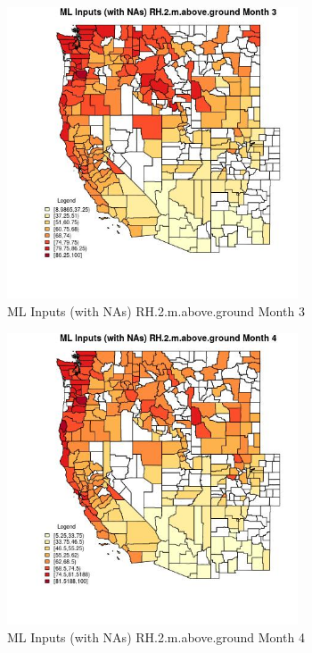\begin{figure} 
\centering  
\includegraphics[width=0.77\textwidth]{Code_Outputs/Report_ML_input_PM25_Step4_part_e_de_duplicated_aves_compiled_2019-05-21wNAs_CountyRH2mabovegroundmedianMonth3.jpg} 
\caption{\label{fig:Report_ML_input_PM25_Step4_part_e_de_duplicated_aves_compiled_2019-05-21wNAsCountyRH2mabovegroundmedianMonth3}ML Inputs (with NAs) RH.2.m.above.ground Month 3} 
\end{figure} 
 

\begin{figure} 
\centering  
\includegraphics[width=0.77\textwidth]{Code_Outputs/Report_ML_input_PM25_Step4_part_e_de_duplicated_aves_compiled_2019-05-21wNAs_CountyRH2mabovegroundmedianMonth4.jpg} 
\caption{\label{fig:Report_ML_input_PM25_Step4_part_e_de_duplicated_aves_compiled_2019-05-21wNAsCountyRH2mabovegroundmedianMonth4}ML Inputs (with NAs) RH.2.m.above.ground Month 4} 
\end{figure} 
 

